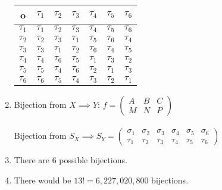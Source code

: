 \begin{enumerate}[{a.}]
\begin{multicols}{2}
	\begin{tabular}{c| c c c c c c}
		o & $\tau_1$ & $\tau_2$ & $\tau_3$ & $\tau_4$ & $\tau_5$ & $\tau_6$\\
		\hline
		$\tau_1$ & $\tau_1$ & $\tau_2$ & $\tau_3$ & $\tau_4$ & $\tau_5$ & $\tau_6$\\
		$\tau_2$ & $\tau_2$ & $\tau_3$ & $\tau_1$ & $\tau_5$ & $\tau_6$ & $\tau_4$\\
		$\tau_3$ & $\tau_3$ & $\tau_1$ & $\tau_2$ & $\tau_6$ & $\tau_4$ & $\tau_5$\\
		$\tau_4$ & $\tau_4$ & $\tau_6$ & $\tau_5$ & $\tau_1$ & $\tau_3$ & $\tau_2$\\
		$\tau_5$ & $\tau_5$ & $\tau_4$ & $\tau_6$ & $\tau_2$ & $\tau_1$ & $\tau_3$\\
		$\tau_6$ & $\tau_6$ & $\tau_5$ & $\tau_4$ & $\tau_3$ & $\tau_2$ & $\tau_1$\\
	\end{tabular}
	\end{multicols}
	
\item
Bijection from $X\implies Y$:
$f = \begin{pmatrix}
A & B & C\\
M & N & P
\end{pmatrix}$\\
\\
Bijection from $S_X \implies S_Y = \begin{pmatrix}
\sigma_1 & \sigma_2 & \sigma_3 & \sigma_4 & \sigma_5 & \sigma_6\\
\tau_1 & \tau_2 & \tau_3 & \tau_4 & \tau_5 & \tau_6
\end{pmatrix}$

\item
There are 6 possible bijections.

\item
There would be $13!=6,227,020,800$ bijections.
\end{enumerate}

